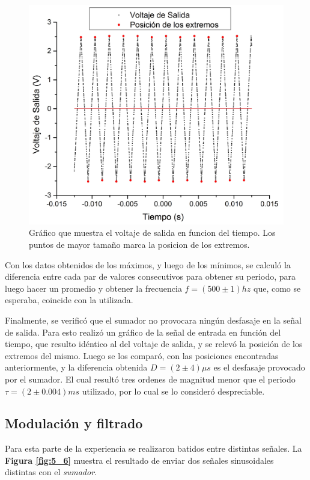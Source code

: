 \documentclass[11pt,a4paper]{article}
\begin{document}
\begin{figure}[h]
\centering
\includegraphics[scale=0.35]{Voltaje_de_Salida}
\caption{Gráfico que muestra el voltaje de salida en funcion del tiempo. Los puntos de mayor tamaño marca la posicion de los extremos.}
\label{fig:Vol_Sal}
\end{figure}

Con los datos obtenidos de los máximos, y luego de los mínimos, se calculó la diferencia entre cada par de valores consecutivos para obtener su periodo, para luego hacer un promedio y obtener la frecuencia $f= (500 \pm 1)hz$ que, como se esperaba, coincide con la utilizada.

Finalmente, se verificó que el sumador no provocara ningún desfasaje en la señal de salida. Para esto realizó un gráfico de la señal de entrada en función del tiempo, que resulto idéntico al del voltaje de salida, y se relevó la posición de los extremos del mismo. Luego se los comparó, con las posiciones encontradas anteriormente, y la diferencia obtenida $D= (2 \pm4)\mu s$ es el desfasaje provocado por el sumador. El cual resultó tres ordenes de magnitud menor que el periodo $\tau = (2 \pm 0.004)ms$ utilizado, por lo cual se lo consideró despreciable.


\subsection{Modulación y filtrado}

Para esta parte de la experiencia se realizaron batidos entre distintas señales. La \textbf{Figura \ref{fig:5_6}} muestra el resultado de enviar dos señales sinusoidales distintas con el \textit{sumador}.
\end{document}
